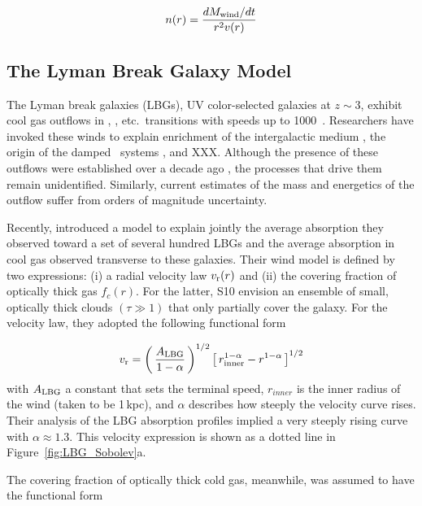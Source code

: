 \documentclass[12pt,preprint]{aastex}
\begin{document}
\begin{equation}
n(r) = \frac{dM_{\rm wind}/dt}{r^2 v(r)}
\end{equation}

\subsection{The Lyman Break Galaxy Model}
\label{sec:lbg}

The Lyman break galaxies (LBGs), UV color-selected galaxies at $z \sim 3$,
exhibit cool gas outflows in , ,
etc.\ transitions with speeds up to 1000\kms\
\citep[e.g.][]{lowenthal,pettini,steidel+10}.
Researchers have invoked these winds to explain enrichment of
the intergalactic medium \citep[e.g.][]{aguirre,evan}, the origin of the
damped \lya\ systems \citep{nelson,joop98}, and XXX.  Although the
presence of these outflows were established over a decade ago
\citep{lowenthal,pettini98}, the processes that drive them remain
unidentified.  Similarly,  current estimates of the mass and energetics of the
outflow suffer from orders of magnitude uncertainty.

Recently, \cite[][; hereafter S10]{steidel+10} introduced a model to
explain jointly the average absorption they observed
toward a set of several hundred LBGs and the average absorption in cool gas
observed transverse to these galaxies.  
Their wind model is defined by two
expressions: (i) a radial velocity law $v_{\rm r}(r)$ and (ii) the covering
fraction of optically thick gas $f_c(r)$.  For the latter, S10
envision an 
ensemble of small, optically thick clouds $(\tau \gg 1)$ that only
partially cover the galaxy.
For the velocity law, they adopted the following functional
form

\begin{equation}
v_{\rm r} = \left ( \, \frac{A_{\rm LBG}}{1-\alpha} \, \right )^{1/2} \left [ \, r_{\rm
  inner}^{1-\alpha} - r^{1-\alpha} \, \right ]^{1/2}
\label{eqn:LBG_vlaw}
\end{equation}
with $A_{\rm LBG}$ a constant that sets the terminal speed,
$r_{inner}$ is the inner radius of the wind (taken to be 1\,kpc), and
$\alpha$ describes how steeply the velocity curve rises.  Their
analysis of the LBG absorption profiles implied
a very steeply rising curve with $\alpha \approx 1.3$.
This velocity expression is shown as a dotted line in 
Figure~\ref{fig:LBG_Sobolev}a.  

The covering fraction of optically thick cold gas, meanwhile, was assumed to have
the functional form
\end{document}
